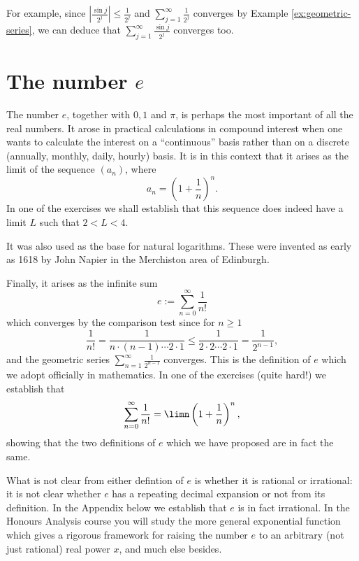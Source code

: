 \documentclass[11pt,dvipsnames]{book}
\numberwithin{figure}{section} %
\numberwithin{table}{section} %
\begin{document}
For example, since $\left|\frac{\sin j}{2^{j}}\right|\leq \frac{1}{2^{j}}$ and $\sum_{j=1}^\infty \frac{1}{2^{j}}$ converges by Example \ref{ex:geometric-series}, we can deduce that $\sum_{j=1}^\infty \frac{\sin j}{2^{j}}$ converges too.

\section{The number $e$}%
\label{numbere}
The number $e$, together with $0,1$ and $\pi$, is perhaps the most important of all the real numbers.
It arose in practical calculations in compound interest when one wants to calculate the interest on a ``continuous'' basis rather than on a discrete (annually, monthly, daily, hourly) basis. It is in this context that it arises as the limit of the sequence $(a_n)$, where
\[ a_n = \left(1 + \frac{1}{n}\right)^n.\]
In one of the exercises we shall establish that this sequence does indeed have a limit $L$ such that $2 < L < 4$.

It was also used as the base for natural logarithms. These were invented as early as 1618 by John Napier in the Merchiston area of Edinburgh.

Finally, it arises as the infinite sum
\[ e := \sum_{n=0}^\infty \frac{1}{n!}\]
which converges by the comparison test since for $n \geq 1$
\[
\frac{1}{n!}=\frac{1}{n\cdot (n-1)\cdots 2\cdot 1}\leq \frac{1}{2\cdot 2\cdots 2\cdot 1 } = \frac{1}{2^{n-1}},
\]
and the geometric series $\sum_{n=1}^{\infty}\frac{1}{2^{n-1}}$ converges. This is the definition of $e$ which we adopt officially in mathematics. In one of the exercises (quite hard!) we establish that
\[
\sum_{n=0}^\infty \frac{1}{n!} = \limn \left(1 + \frac{1}{n}\right)^n,\]
showing that the two definitions of $e$ which we have proposed are in fact the same.

What is not clear from either defintion of $e$ is whether it is rational or irrational: it is not clear whether $e$ has a repeating decimal expansion or not from its definition. In the Appendix below we establish that $e$ is in fact irrational.
In the Honours Analysis course you will study the more general exponential function which gives a rigorous framework for raising the number $e$ to an arbitrary (not just rational) real power $x$, and much else besides.
\end{document}
